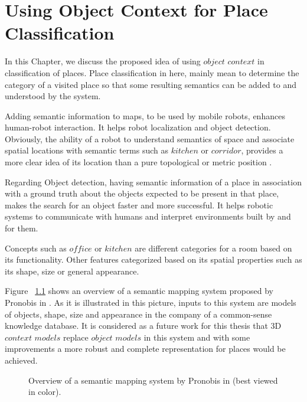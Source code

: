 \chapter{Using Object Context for Place Classification}
\label{UsingObjectContextforPlaceClassification.ch}

In this Chapter, we discuss the proposed idea of using $object$ $context$ in classification of places.
Place classification in here, mainly mean to determine the category of a visited place so that some resulting semantics 
can be added to and understood by the system.

Adding semantic information to maps, to be used by mobile robots, enhances human-robot interaction.
It helps robot localization and object detection.
Obviously, the ability of a robot to understand semantics of space and associate spatial locations with semantic terms 
such as $kitchen$ or $corridor$, provides a more clear idea of its location than a pure topological or metric position \cite{pronobis2011phd}.   

Regarding Object detection, having semantic information of a place in association with a ground truth about the objects expected
to be present in that place, makes the search for an object faster and more successful.
It helps robotic systems to communicate with humans and interpret environments built by and for them.

Concepts such as $office$ or $kitchen$ are different categories for a room based on its functionality.
Other features categorized based on its spatial properties such as its shape, size or general appearance.

Figure ~\ref{semanticmapping.figure} shows an overview of a semantic mapping system proposed by Pronobis in \cite{pronobis2011phd}.
As it is illustrated in this picture, inputs to this system are models of objects, shape, size and appearance in the company of a 
common-sense knowledge database.
It is considered as a future work for this thesis that 3D $context$ $models$ replace $object$ $models$ in this system and with some improvements 
a more robust and complete representation for places would be achieved.

\begin{figure}[t]
  \caption[Overview of a semantic mapping system]
  {Overview of a semantic mapping system by Pronobis in \cite{pronobis2011phd}(best viewed in color).}
  \label{semanticmapping.figure}
\end{figure}

